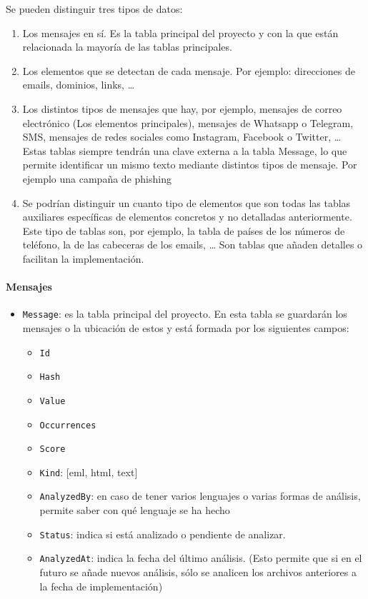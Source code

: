 Se pueden distinguir tres tipos de datos: 

\begin{enumerate}
    \item Los mensajes en sí. Es la tabla principal del proyecto y con la que están relacionada la mayoría de las tablas principales.
    \item Los elementos que se detectan de cada mensaje. Por ejemplo: direcciones de emails, dominios, links, …
    \item Los distintos tipos de mensajes que hay, por ejemplo, mensajes de correo electrónico (Los elementos principales), mensajes de Whatsapp o Telegram, SMS, mensajes de redes sociales como Instagram, Facebook o Twitter, …
    Estas tablas siempre tendrán una clave externa a la tabla Message, lo que permite identificar un mismo texto mediante distintos tipos de mensaje. Por ejemplo una campaña de phishing 
    \item Se podrían distinguir un cuanto tipo de elementos que son todas las tablas auxiliares específicas de elementos concretos y no detalladas anteriormente. Este tipo de tablas son, por ejemplo, la tabla de países de los números de teléfono, la de las cabeceras de los emails, … Son tablas que añaden detalles o facilitan la implementación. 
    
\end{enumerate}

\paragraph{Mensajes}
\begin{itemize}
    \item \texttt{Message}: es la tabla principal del proyecto. En esta tabla se guardarán los mensajes o la ubicación de estos y está formada por los siguientes campos: 
\begin{itemize}
    \item \texttt{Id}
    \item \texttt{Hash}
    \item \texttt{Value}
    \item \texttt{Occurrences}
    \item \texttt{Score}
    \item \texttt{Kind}: [eml, html, text]
    \item \texttt{AnalyzedBy}: en caso de tener varios lenguajes o varias formas de análisis, permite saber con qué lenguaje se ha hecho
    \item \texttt{Status}: indica si está analizado o pendiente de analizar.
    \item \texttt{AnalyzedAt}: indica la fecha del último análisis. (Esto permite que si en el futuro se añade nuevos análisis, sólo se analicen los archivos anteriores a la fecha de implementación)
\end{itemize}
\end{itemize}

